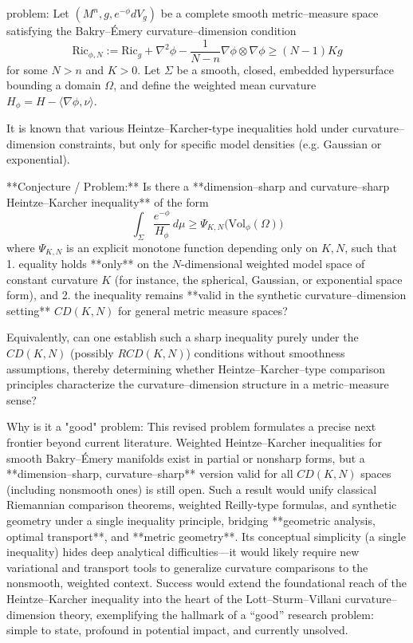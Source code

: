 problem:  
Let \((M^n,g,e^{-\phi} dV_g)\) be a complete smooth metric–measure space satisfying the Bakry–Émery curvature–dimension condition  
\[
\mathrm{Ric}_{\phi,N} := \mathrm{Ric}_g + \nabla^2 \phi - \frac{1}{N-n}\nabla \phi\otimes \nabla \phi \ge (N-1)K g
\]
for some \(N>n\) and \(K>0\).  
Let \(\Sigma\) be a smooth, closed, embedded hypersurface bounding a domain \(\Omega\), and define the weighted mean curvature \(H_{\phi} = H - \langle\nabla \phi ,\nu\rangle.\)

It is known that various Heintze–Karcher-type inequalities hold under curvature–dimension constraints, but only for specific model densities (e.g. Gaussian or exponential).  

**Conjecture / Problem:**  
Is there a **dimension–sharp and curvature–sharp Heintze–Karcher inequality** of the form  
\[
\int_{\Sigma}\frac{e^{-\phi}}{H_{\phi}}\,d\mu \geq \Psi_{K,N}\big(\mathrm{Vol}_{\phi}(\Omega)\big)
\]
where \(\Psi_{K,N}\) is an explicit monotone function depending only on \(K,N\), such that  
1. equality holds **only** on the \(N\)-dimensional weighted model space of constant curvature \(K\) (for instance, the spherical, Gaussian, or exponential space form), and  
2. the inequality remains **valid in the synthetic curvature–dimension setting** \(CD(K,N)\) for general metric measure spaces?  

Equivalently, can one establish such a sharp inequality purely under the \(CD(K,N)\) (possibly \(RCD(K,N)\)) conditions without smoothness assumptions, thereby determining whether Heintze–Karcher–type comparison principles characterize the curvature–dimension structure in a metric–measure sense?

Why is it a "good" problem:  
This revised problem formulates a precise next frontier beyond current literature. Weighted Heintze–Karcher inequalities for smooth Bakry–Émery manifolds exist in partial or nonsharp forms, but a **dimension–sharp, curvature–sharp** version valid for all \(CD(K,N)\) spaces (including nonsmooth ones) is still open. Such a result would unify classical Riemannian comparison theorems, weighted Reilly-type formulas, and synthetic geometry under a single inequality principle, bridging **geometric analysis, optimal transport**, and **metric geometry**.  
Its conceptual simplicity (a single inequality) hides deep analytical difficulties—it would likely require new variational and transport tools to generalize curvature comparisons to the nonsmooth, weighted context. Success would extend the foundational reach of the Heintze–Karcher inequality into the heart of the Lott–Sturm–Villani curvature–dimension theory, exemplifying the hallmark of a “good” research problem: simple to state, profound in potential impact, and currently unsolved.